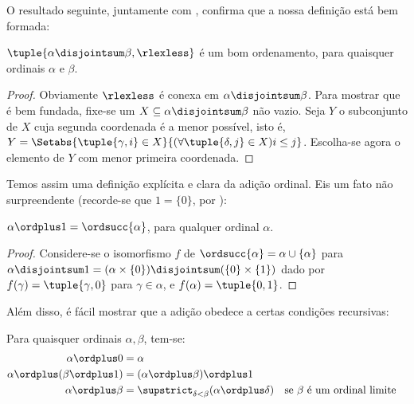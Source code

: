 \documentclass[../../../include/open-logic-section]{subfiles}
\begin{document}
O resultado seguinte, juntamente com
, confirma que a nossa
definição está bem formada:

\begin{lem}
$\tuple{\alpha \disjointsum \beta, \rlexless}$ é um bom ordenamento, para
quaisquer ordinais $\alpha$ e $\beta$.
\end{lem}

\begin{proof}
Obviamente $\rlexless$ é conexa em $\alpha \disjointsum \beta$. Para
mostrar que é bem fundada, fixe-se um $X \subseteq \alpha
\disjointsum \beta$ não vazio. Seja $Y$ o subconjunto de $X$ cuja segunda coordenada é a menor possível, isto é, $Y = \Setabs{\tuple{\gamma, i} \in X}{(\forall \tuple{\delta, j} \in X)i \leq j}$. Escolha-se agora o elemento de $Y$ com menor primeira coordenada.
\end{proof}
\noindent
Temos assim uma definição explícita e clara da adição ordinal. Eis um
fato não surpreendente (recorde-se que  $1 = \{0\}$, por
):
\begin{prop}
$\alpha \ordplus  1 = \ordsucc{\alpha}$, para qualquer ordinal $\alpha$.
\end{prop}

\begin{proof}
Considere-se o isomorfismo $f$ de $\ordsucc{\alpha} = \alpha \cup
\{\alpha\}$ para $\alpha\disjointsum1 = (\alpha \times \{0\})
\disjointsum (\{0\} \times \{1\})$ dado por $f(\gamma) =
\tuple{\gamma, 0}$ para $\gamma \in \alpha$, e $f(\alpha) = \tuple{0,
1}$.
\end{proof}
\noindent
Além disso, é fácil mostrar que a adição obedece a certas condições
recursivas:

\begin{lem}
Para quaisquer ordinais $\alpha, \beta$, tem-se:
\begin{align*}
	\alpha\ordplus 0 &= \alpha\\
	\alpha \ordplus  (\beta\ordplus 1) &= (\alpha \ordplus  \beta) \ordplus  1\\
	\alpha  \ordplus  \beta &= \supstrict_{\delta < \beta}(\alpha \ordplus  \delta) && \text{se $\beta $ é um ordinal limite}
\end{align*}
\end{lem}
\end{document}
